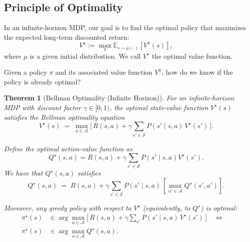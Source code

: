 \documentclass[
]{book}
\newtheorem{theorem}{Theorem}[chapter]
\theoremstyle{definition}
\theoremstyle{definition}
\theoremstyle{definition}
\theoremstyle{definition}
\theoremstyle{remark}
\begin{document}
\subsection{Principle of Optimality}\label{principle-of-optimality}

In an infinite-horizon MDP, our goal is to find the optimal policy that maximizes the expected long-term discounted return:
\[
V^\star := \max_{\pi} \mathbb{E}_{s \sim \mu(\cdot)} [V^\pi(s)],
\]
where \(\mu\) is a given initial distribution. We call \(V^\star\) the optimal value function.

Given a policy \(\pi\) and its associated value function \(V^\pi\), how do we know if the policy is already optimal?

\begin{theorem}[Bellman Optimality (Infinite Horizon)]
\protect\hypertarget{thm:BellmanOptimalityInfiniteHorizon}{}\label{thm:BellmanOptimalityInfiniteHorizon}For an infinite-horizon MDP with discount factor \(\gamma \in [0,1)\),
the optimal state-value function \(V^\star(s)\)
satisfies the Bellman optimality equation
\begin{equation}
V^\star(s) \;=\; \max_{a \in \mathcal{A}}
\Big[\, R(s,a) + \gamma \sum_{s' \in \mathcal{S}} P(s' \mid s,a)\, V^\star(s') \,\Big].
\label{eq:BellmanOptimalityInfiniteHorizonStateValue}
\end{equation}

Define the optimal action-value function as
\begin{equation}
Q^\star(s,a) = R(s,a) + \gamma \sum_{s' \in \mathcal{S}} P(s' \mid s, a) V^\star(s').
\label{eq:InfiniteHorizonOptimalActionValue}
\end{equation}
We have that \(Q^\star(s,a)\) satisfies
\begin{equation}
Q^\star(s,a) \;=\; R(s,a) + \gamma \sum_{s' \in \mathcal{S}} P(s' \mid s,a)\, \left[\max_{a' \in \mathcal{A}} Q^\star(s',a') \right].
\label{eq:BellmanOptimalityInfiniteHorizonActionValue}
\end{equation}

Moreover, any greedy policy with respect to \(V^\star\) (equivalently, to \(Q^\star\)) is optimal:
\begin{equation}
\begin{split}
\pi^\star(s) & \in \arg\max_{a \in \mathcal{A}}
\Big[\, R(s,a) + \gamma \sum_{s'} P(s' \mid s,a)\, V^\star(s') \,\Big]
\quad\Longleftrightarrow\quad \\
\pi^\star(s) & \in \arg\max_{a \in \mathcal{A}} Q^\star(s,a).
\end{split}
\label{eq:InfiniteHorizonOptimalPolicy}
\end{equation}
\end{theorem}
\end{document}
